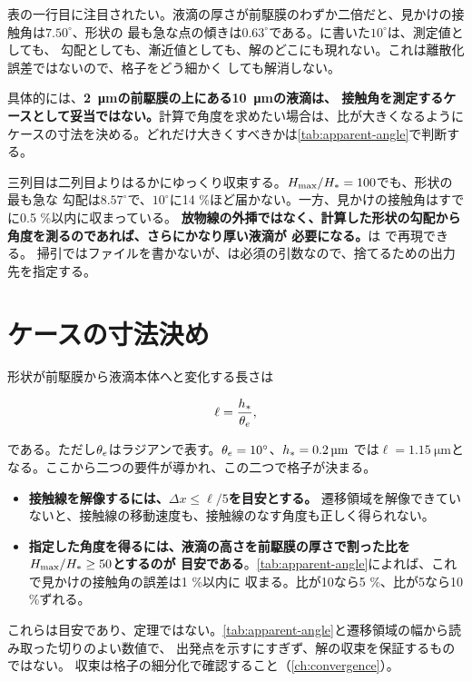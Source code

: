 \begin{warn}[$\Hmax/\Hstar = 2$では指定した角度がどこにも現れない]
  表の一行目に注目されたい。液滴の厚さが前駆膜のわずか二倍だと、見かけの接触角は$7.50^\circ$、形状の
  最も急な点の傾きは$0.63^\circ$である。に書いた$10^\circ$は、測定値としても、
  勾配としても、漸近値としても、解のどこにも現れない。これは離散化誤差ではないので、格子をどう細かく
  しても解消しない。

  具体的には、\textbf{\SI{2}{\micro\metre}の前駆膜の上にある\SI{10}{\micro\metre}の液滴は、
  接触角を測定するケースとして妥当ではない。}計算で角度を求めたい場合は、比が大きくなるように
  ケースの寸法を決める。どれだけ大きくすべきかは\cref{tab:apparent-angle}で判断する。
\end{warn}

三列目は二列目よりはるかにゆっくり収束する。$H_{\mathrm{max}}/H_{*} = 100$でも、形状の最も急な
勾配は$8.57^\circ$で、$10^\circ$に14 \%ほど届かない。一方、見かけの接触角はすでに0.5 \%以内に収まっている。
\textbf{放物線の外挿ではなく、計算した形状の勾配から角度を測るのであれば、さらにかなり厚い液滴が
必要になる。}は
で再現できる。
掃引ではファイルを書かないが、は必須の引数なので、捨てるための出力先を指定する。

\section{ケースの寸法決め}
\label{sec:wetting:sizing}

形状が前駆膜から液滴本体へと変化する長さは

\begin{equation}\label{eq:transition-length}
  \ell = \frac{h_{*}}{\theta_{e}},
\end{equation}

である。ただし$\theta_{e}$はラジアンで表す。$\theta_{e} = 10^\circ$、$h_{*} = \SI{0.2}{\micro\metre}$
では$\ell = \SI{1.15}{\micro\metre}$となる。ここから二つの要件が導かれ、この二つで格子が決まる。

\begin{tip}[接触線のケースの二つの目安]
  \begin{itemize}
    \item \textbf{接触線を解像するには、$\Delta x \le \ell/5$を目安とする。}
      遷移領域を解像できていないと、接触線の移動速度も、接触線のなす角度も正しく得られない。
    \item \textbf{指定した角度を得るには、液滴の高さを前駆膜の厚さで割った比を$H_{\mathrm{max}}/H_{*} \ge 50$とするのが
      目安である}。\cref{tab:apparent-angle}によれば、これで見かけの接触角の誤差は1 \%以内に
      収まる。比が10なら5 \%、比が5なら10 \%ずれる。
  \end{itemize}
  これらは目安であり、定理ではない。\cref{tab:apparent-angle}と遷移領域の幅から読み取った切りのよい数値で、
  出発点を示すにすぎず、解の収束を保証するものではない。
  収束は格子の細分化で確認すること（\cref{ch:convergence}）。
\end{tip}

